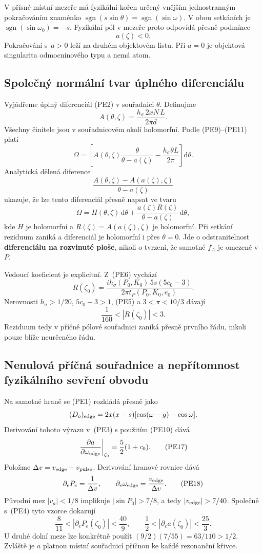\documentclass[11pt,a4paper]{article}
\theoremstyle{remark}\newtheorem{remark}[theorem]{Poznámka}
\numberwithin{equation}{section}
\begin{document}
V přísné místní mezeře má fyzikální kořen určený vnějším
jednostranným pokračováním znaménko
\(\operatorname{sgn}(s\sin\theta)=\operatorname{sgn}(\sin\omega)\).
V obou setkáních je
\(\operatorname{sgn}(\sin\omega_0)=-s\). Fyzikální pól
v mezeře proto odpovídá přesně podmínce
\[
\boxed{a(\zeta)<0.}
\tag{PE13}
\]
Pokračování s~\(a>0\) leží na druhém objektovém listu.
Při \(a=0\) je objektová singularita odmocninového typu
a nemá atom.

\subsection{Společný normální tvar úplného diferenciálu}

Vyjádřeme úplný diferenciál (PE2) v souřadnici \(\theta\).
Definujme
\[
A(\theta,\zeta)
=\frac{h_\sigma\,2xN\,L}{2\pi d}.
\]
Všechny činitele jsou v souřadnicovém okolí holomorfní.
Podle (PE9)--(PE11) platí
\[
\Omega=
\left[
A(\theta,\zeta)\frac{\theta}{\theta-a(\zeta)}
-\frac{h_\sigma\theta L}{2\pi}
\right]\mathrm d\theta.
\]
Analytická dělená diference
\[
\frac{A(\theta,\zeta)-A(a(\zeta),\zeta)}
{\theta-a(\zeta)}
\]
ukazuje, že lze tento diferenciál přesně napsat ve tvaru
\[
\boxed{
\Omega=H(\theta,\zeta)\,\mathrm d\theta
+\frac{a(\zeta)R(\zeta)}{\theta-a(\zeta)}\,\mathrm d\theta,
}
\tag{PE14}
\]
kde \(H\) je holomorfní a
\(R(\zeta)=A(a(\zeta),\zeta)\) je holomorfní. Při setkání
reziduum zaniká a diferenciál je holomorfní i přes
\(\theta=0\). Jde o odstranitelnost \textbf{diferenciálu na
rozvinuté ploše}, nikoli o tvrzení, že samotné \(f_A\) je
omezené v~\(P\).

Vedoucí koeficient je explicitní. Z~(PE6) vychází
\[
\boxed{
R(\zeta_0)=
\frac{i h_\sigma(P_0,K_0)\,5s(5c_0-3)}
{2\pi t_P(P_0,K_0,e_0)}.
}
\tag{PE15}
\]
Nerovnosti \(h_\sigma>1/20\), \(5c_0-3>1\), (PE5)
a \(3<\pi<10/3\) dávají
\[
\boxed{\frac1{160}<|R(\zeta_0)|<3.}
\tag{PE16}
\]
Reziduum tedy v příčné pólové souřadnici zaniká přesně prvního
řádu, nikoli pouze blíže neurčeného řádu.

\subsection{Nenulová příčná souřadnice a nepřítomnost fyzikálního sevření obvodu}

Na samotné hraně se (PE1) rozkládá přesně jako
\[
(D_o)_{\rm edge}
=2x(x-s)[\cos(\omega-g)-\cos\omega].
\]
Derivování tohoto výrazu v~(PE3) s použitím (PE10) dává
\[
\left.
\frac{\partial a}{\partial\omega_{\rm edge}}
\right|_{\zeta_0}
=\frac52(1+c_0).
\tag{PE17}
\]
Položme \(\Delta v=v_{\rm edge}-v_{\rm pulse}\).
Derivování hranové rovnice dává
\[
\partial_eP_e=\frac1{\Delta v},\qquad
\partial_e\omega_{\rm edge}=\frac{v_{\rm edge}}{\Delta v}.
\tag{PE18}
\]
Původní mez \(|v_a|<1/8\) implikuje \(|\sin P_0|>7/8\),
a tedy \(|v_{\rm edge}|>7/40\). Společně s~(PE4) tyto
vzorce dokazují
\[
\boxed{
\frac8{11}<|\partial_eP_e(\zeta_0)|<\frac{40}{9},
\qquad
\frac12<|\partial_ea(\zeta_0)|<\frac{25}{3}.
}
\tag{PE19}
\]
U druhé dolní meze lze konkrétně použít
\((9/2)(7/55)=63/110>1/2\). Zvláště je \(a\) platnou
místní souřadnicí příčnou ke každé rezonanční křivce.
\end{document}
